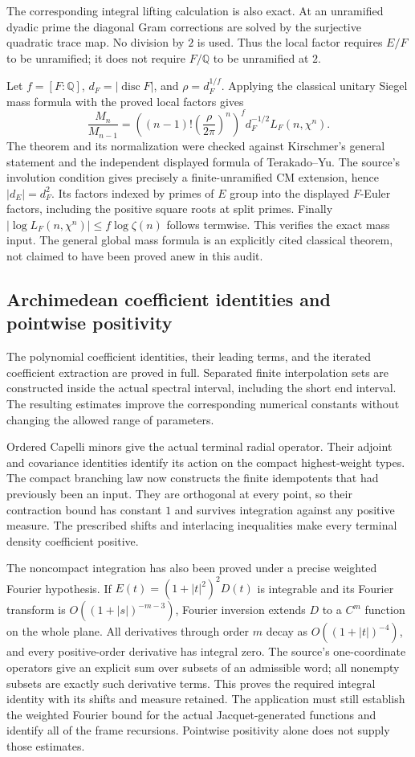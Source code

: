 \documentclass[11pt,a4paper]{article}
\theoremstyle{remark}
\newcommand{\Q}{\mathbb Q}
\begin{document}
The corresponding integral lifting calculation is also exact.
At an unramified dyadic prime the diagonal Gram corrections are
solved by the surjective quadratic trace map. No division by $2$
is used. Thus the local factor requires $E/F$ to be unramified;
it does not require $F/\Q$ to be unramified at $2$.

Let $f=[F:\Q]$, $d_F=|\operatorname{disc}F|$, and
$\rho=d_F^{1/f}$. Applying the classical unitary Siegel mass
formula with the proved local factors gives
\[
 \frac{M_n}{M_{n-1}}
   =\left((n-1)!\left(\frac{\rho}{2\pi}\right)^n\right)^f
                  d_F^{-1/2}L_F(n,\chi^n).
\]
The theorem and its normalization were checked against
Kirschmer's general statement and the independent displayed
formula of Terakado--Yu.\cite{kirschmer-herm,terakado-yu-mass}
The source's involution condition gives precisely a finite-unramified
CM extension, hence $|d_E|=d_F^2$. Its factors indexed by primes of
$E$ group into the displayed $F$-Euler factors, including the
positive square roots at split primes. Finally
$|\log L_F(n,\chi^n)|\le f\log\zeta(n)$ follows termwise.
This verifies the exact mass input. The general global mass
formula is an explicitly cited classical theorem, not claimed
to have been proved anew in this audit.

\subsection{Archimedean coefficient identities and pointwise positivity}

The polynomial coefficient identities, their leading terms, and the
iterated coefficient extraction are proved in full. Separated finite
interpolation sets are constructed inside the actual spectral
interval, including the short end interval. The resulting estimates
improve the corresponding numerical constants without changing
the allowed range of parameters.

Ordered Capelli minors give the actual terminal radial operator.
Their adjoint and covariance identities identify its action on the
compact highest-weight types. The compact branching law now
constructs the finite idempotents that had previously been an input.
They are orthogonal at every point, so their contraction bound has
constant $1$ and survives integration against any positive measure.
The prescribed shifts and interlacing inequalities make every
terminal density coefficient positive.

The noncompact integration has also been proved under a precise
weighted Fourier hypothesis. If $E(t)=(1+|t|^2)^2D(t)$ is integrable
and its Fourier transform is $O((1+|s|)^{-m-3})$, Fourier inversion
extends $D$ to a $C^m$ function on the whole plane. All derivatives
through order $m$ decay as $O((1+|t|)^{-4})$, and every positive-order
derivative has integral zero. The source's one-coordinate operators
give an explicit sum over subsets of an admissible word; all nonempty
subsets are exactly such derivative terms. This proves the required
integral identity with its shifts and measure retained.
The application must still establish the weighted Fourier bound for
the actual Jacquet-generated functions and identify all of the frame
recursions. Pointwise positivity alone does not supply those estimates.
\end{document}
